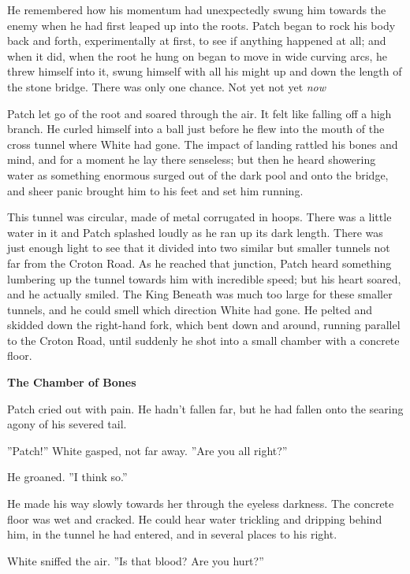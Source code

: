\documentclass[11pt]{article}
\begin{document}
 He remembered how his momentum had unexpectedly swung him towards the enemy when he had first leaped up into the roots. Patch began to rock his body back and forth, experimentally at first, to see if anything happened at all; and when it did, when the root he hung on began to move in wide curving arcs, he threw himself into it, swung himself with all his might up and down the length of the stone bridge. There was only one chance. Not yet %
 not yet %
 {\it now} %
\par
 Patch let go of the root and soared through the air. It felt like falling off a high branch. He curled himself into a ball just before he flew into the mouth of the cross tunnel where White had gone. The impact of landing rattled his bones and mind, and for a moment he lay there senseless; but then he heard showering water as something enormous surged out of the dark pool and onto the bridge, and sheer panic brought him to his feet and set him running.\par
 This tunnel was circular, made of metal corrugated in hoops. There was a little water in it and Patch splashed loudly as he ran up its dark length. There was just enough light to see that it divided into two similar but smaller tunnels not far from the Croton Road. As he reached that junction, Patch heard something lumbering up the tunnel towards him with incredible speed; but his heart soared, and he actually smiled. The King Beneath was much too large for these smaller tunnels, and he could smell which direction White had gone. He pelted and skidded down the right-hand fork, which bent down and around, running parallel to the Croton Road, until suddenly he shot into a small chamber with a concrete floor.\par
\par
{\bf The Chamber of Bones\par
}\par
 Patch cried out with pain. He hadn't fallen far, but he had fallen onto the searing agony of his severed tail.\par
 ''Patch!'' White gasped, not far away. ''Are you all right?''\par
 He groaned. ''I think so.''\par
 He made his way slowly towards her through the eyeless darkness. The concrete floor was wet and cracked. He could hear water trickling and dripping behind him, in the tunnel he had entered, and in several places to his right.\par
 White sniffed the air. ''Is that blood? Are you hurt?''\par
\end{document}
